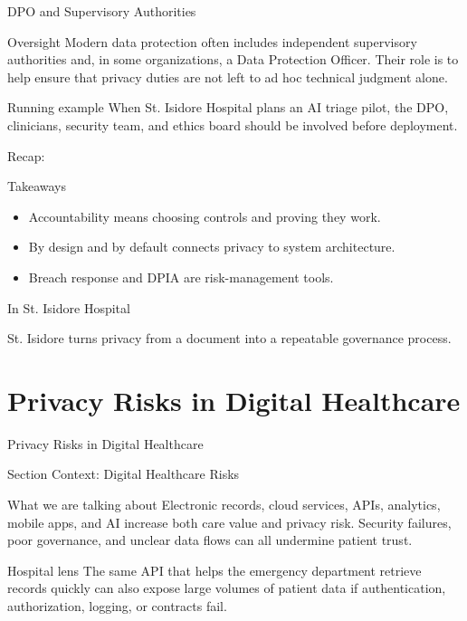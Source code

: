 \documentclass[presentation]{beamer}
\newcommand{\sectiontitleframe}[1]{
\begin{frame}[plain,c]
\begin{center}
{\usebeamerfont{title}\usebeamercolor[fg]{title}#1}
\end{center}
\end{frame}
}
\newcommand{\scenario}{St. Isidore Hospital}
\newcommand{\takeawaysframe}[2]{
\begin{frame}[c]{Recap: \insertsection}
\begin{block}{Takeaways}
#1
\end{block}
\begin{exampleblock}{In \scenario}
#2
\end{exampleblock}
\end{frame}
}
\begin{document}
\begin{frame}[c]{DPO and Supervisory Authorities}
\begin{block}{Oversight}
Modern data protection often includes independent supervisory authorities and, in some
organizations, a Data Protection Officer. Their role is to help ensure that privacy duties are not
left to ad hoc technical judgment alone.
\end{block}

\begin{exampleblock}{Running example}
When \scenario{} plans an AI triage pilot, the DPO, clinicians, security team, and ethics board
should be involved before deployment.
\end{exampleblock}
\end{frame}

\takeawaysframe{
\begin{itemize}
    \item Accountability means choosing controls and proving they work.
    \item By design and by default connects privacy to system architecture.
    \item Breach response and DPIA are risk-management tools.
\end{itemize}
}{
St. Isidore turns privacy from a document into a repeatable governance process.
}

\section{Privacy Risks in Digital Healthcare}
\sectiontitleframe{Privacy Risks in Digital Healthcare}

\begin{frame}[c]{Section Context: Digital Healthcare Risks}
\begin{block}{What we are talking about}
Electronic records, cloud services, APIs, analytics, mobile apps, and AI increase both care value
and privacy risk. Security failures, poor governance, and unclear data flows can all undermine
patient trust.
\end{block}

\begin{exampleblock}{Hospital lens}
The same API that helps the emergency department retrieve records quickly can also expose large
volumes of patient data if authentication, authorization, logging, or contracts fail.
\end{exampleblock}
\end{frame}
\end{document}
